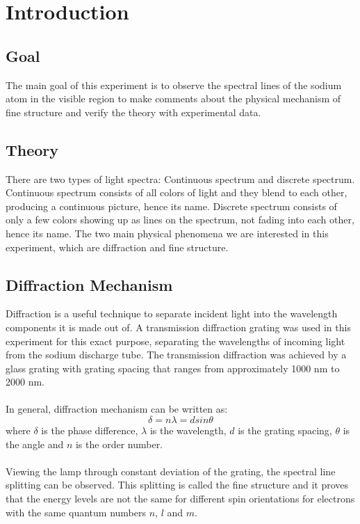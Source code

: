 \section{Introduction}

	\subsection{Goal}
	The main goal of this experiment is to observe the spectral lines of the sodium atom in the visible region to make comments about the physical mechanism of fine structure and verify the theory with experimental data.
	
	\subsection{Theory}
		There are two types of light spectra: Continuous spectrum and discrete spectrum. Continuous spectrum consists of all colors of light and they blend to each other, producing a continuous picture, hence its name. Discrete spectrum consists of only a few colors showing up as lines on the spectrum, not fading into each other, hence its name. The two main physical phenomena we are interested in this experiment, which are diffraction and fine structure.
		
		\subsection{Diffraction Mechanism}
			Diffraction is a useful technique to separate incident light into the wavelength components it is made out of. A transmission diffraction grating was used in this experiment for this exact purpose, separating the wavelengths of incoming light from the sodium discharge tube. The transmission diffraction was achieved by a glass grating with grating spacing that ranges from approximately 1000 nm to 2000 nm.
			\\
			\\
			In general, diffraction mechanism can be written as:
			\begin{equation}
				\delta = n \lambda = d sin \theta
			\end{equation}
			where $\delta$ is the phase difference, $\lambda$ is the wavelength, $d$ is the grating spacing, $\theta$ is the angle and $n$ is the order number.
			\\
			\\
			Viewing the lamp through constant deviation of the grating, the spectral line splitting can be observed. This splitting is called the fine structure and it proves that the energy levels are not the same for different spin orientations for electrons with the same quantum numbers $n$, $l$ and $m$.
